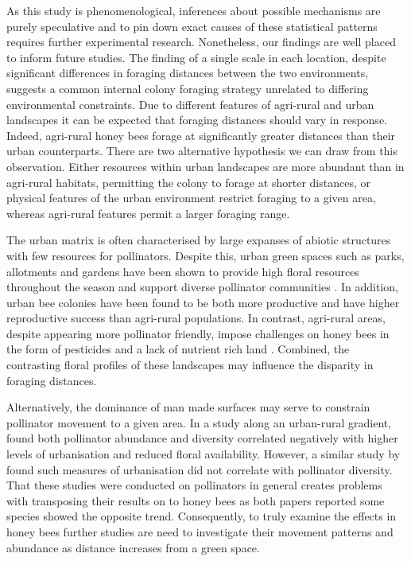 \documentclass[11pt,usenames,dvipsnames,a4paper]{article}
\begin{document}
\begin{linenumbers}
As this study is phenomenological, inferences about possible mechanisms are purely speculative and to pin down exact causes of these statistical patterns requires further experimental research. Nonetheless, our findings are well placed to inform future studies. The finding of a single scale in each location, despite significant differences in foraging distances between the two environments, suggests a common internal colony foraging strategy unrelated to differing environmental constraints. Due to different features of agri-rural and urban landscapes it can be expected that foraging distances should vary in response. Indeed, agri-rural honey bees forage at significantly greater distances than their urban counterparts. There are two alternative hypothesis we can draw from this observation. Either resources within urban landscapes are more abundant than in agri-rural habitats, permitting the colony to forage at shorter distances, or physical features of the urban environment restrict foraging to a given area, whereas agri-rural features permit a larger foraging range.

The urban matrix is often characterised by large expanses of abiotic structures with few resources for pollinators. Despite this, urban green spaces such as parks, allotments and gardens have been shown to provide high floral resources throughout the season \citep{Baldock2015, Baldock2019, Plascencia2017} and support diverse pollinator communities \citep{Hall2017}. In addition, urban bee colonies have been found to be both more productive \citep{Lecocq2015} and have higher reproductive success \citep{Samuelson2018} than agri-rural populations. In contrast, agri-rural areas, despite appearing more pollinator friendly, impose challenges on honey bees in the form of pesticides \citep{Wood2017} and a lack of nutrient rich land \citep{Carvell2006}. Combined, the contrasting floral profiles of these landscapes may influence the disparity in foraging distances.

Alternatively, the dominance of man made surfaces may serve to constrain pollinator movement to a given area. In a study along an urban-rural gradient, \cite{Bates2011} found both pollinator abundance and diversity correlated negatively with higher levels of urbanisation and reduced floral availability. However, a similar study by \cite{Kearns2009} found such measures of urbanisation did not correlate with pollinator diversity. That these studies were conducted on pollinators in general creates problems with transposing their results on to honey bees as both papers reported some species showed the opposite trend. Consequently, to truly examine the effects in honey bees further studies are need to investigate their movement patterns and abundance as distance increases from a green space. 


\end{linenumbers}
\end{document}
